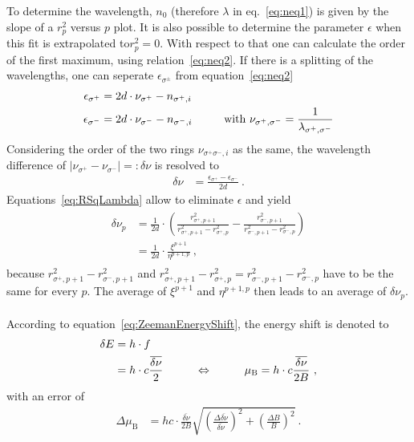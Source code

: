 To determine the wavelength, $n_0$ (therefore $\lambda$ in eq.~\ref{eq:neq1}) is given by the slope of a $r_p^2$ versus $p$ plot.
It is also possible to determine the parameter $\epsilon$ when this fit is extrapolated to\newline$r_p^2 = 0$.
With respect to that one can calculate the order of the first maximum, using relation~\ref{eq:neq2}.
If there is a splitting of the wavelengths, one can seperate $\epsilon_{\sigma^{\pm}}$ from equation~\ref{eq:neq2}
\begin{align}
	\begin{split}
	\epsilon_{\sigma^+} 	&= 2d \cdot \nu_{\sigma^+} - n_{{\sigma^+},i}\\
	\epsilon_{\sigma^-}	&= 2d \cdot \nu_{\sigma^-} - n_{{\sigma^-},i} \hspace{1.0cm} \text{with } \nu_{{\sigma^+},{\sigma^-}} = \frac{1}{\lambda_{{\sigma^+},{\sigma^-}}}
	\end{split}
\end{align}
Considering the order of the two rings $\nu_{{\sigma^+}{\sigma^-},i}$ as the same, the wavelength difference of $\left|\nu_{\sigma^+}-\nu_{\sigma^-}\right| =: \delta \nu$ is resolved to
\begin{align}
	\delta \nu	&= \frac{\epsilon_{\sigma^+} - \epsilon_{\sigma^-}}{2d}\ .
\end{align}
Equations~\ref{eq:RSqLambda} allow to eliminate $\epsilon$ and yield
\begin{align}
	\label{eq:NuOrder}
	\begin{split}
	\delta \nu_p 	&= \frac{1}{2d} \cdot \left(\frac{r_{{\sigma^+},p+1}^2}{r_{{\sigma^+},p+1}^2-r_{{\sigma^+},p}^2} - \frac{r_{{\sigma^-},p+1}^2}{r_{{\sigma^-},p+1}^2-r_{{\sigma^-},p}^2}\right)\\
			&= \frac{1}{2d} \cdot \frac{\xi^{p+1}}{\eta^{p+1,p}}\ ,
	\end{split}
\end{align}
because $r^2_{{\sigma^+},p+1} - r^2_{{\sigma^-},p+1}$ and $r^2_{{\sigma^+},p+1} - r^2_{{\sigma^+},p} = r^2_{{\sigma^-},p+1} - r^2_{{\sigma^-},p}$ have to be the same for every $p$.
The average of $\xi^{p+1}$ and $\eta^{p+1,p}$ then leads to an average of $\delta\nu_p$.\\
\\
According to equation~\ref{eq:ZeemanEnergyShift}, the energy shift is denoted to
\begin{align}
\begin{split}
	\delta E 	&= h\cdot f\\
			&= h\cdot c\frac{\overline{\delta\nu}}{2} \hspace{1.0cm} \Leftrightarrow \hspace{1.0cm} \mu_\text{B} = h \cdot c \frac{\overline{\delta\nu}}{2B}\ ,
\end{split}
	\label{eq:BohrMag1}
\end{align}
with an error of
\begin{align}
	\Delta \mu_\text{B} 	&= hc \cdot \frac{\overline{\delta\nu}}{2B}\sqrt{\left(\frac{\Delta \overline{\delta\nu}}{\overline{\delta\nu}} \right)^2+\left(\frac{\Delta B}{B} \right)^2}\ .
	\label{eq:BohrMag2}
\end{align}
